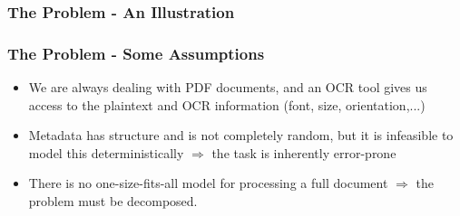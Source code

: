 \documentclass{beamer}
\begin{document}
\begin{frame}
\frametitle{The Problem - An Illustration}
\begin{figure}[!t]
\center
{}
{}
\end{figure}
\end{frame}


\begin{frame}
\frametitle{The Problem - Some Assumptions}
\begin{itemize}
\item We are always dealing with PDF documents, and an OCR tool gives us access to the plaintext and OCR information (font, size, orientation,...)
\item Metadata has structure and is not completely random, but it is infeasible to model this deterministically $\Rightarrow$ the task is inherently error-prone
\item There is no one-size-fits-all model for processing a full document $\Rightarrow$ the problem must be decomposed.
\end{itemize}
\end{frame}
\end{document}
